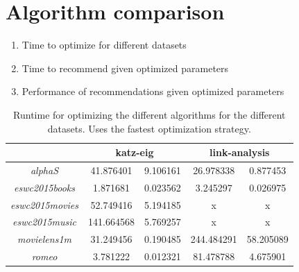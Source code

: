 
\section{Algorithm comparison}


\begin{enumerate}
    \item Time to optimize for different datasets
    \item Time to recommend given optimized parameters
    \item Performance of recommendations given optimized parameters
\end{enumerate}

\begin{table}[h!]
    \centering
    \begin{tabular}{| c | c | c | c | c |}
        \hline
        \textbf{}               & \multicolumn{2}{c|}{\textbf{katz-eig}} & \multicolumn{2}{c|}{\textbf{link-analysis}} \\ \hline
        \textit{alphaS}         & 41.876401     & 9.106161         & 26.978338     & 0.877453      \\ \hline
        \textit{eswc2015books}  & 1.871681      & 0.023562         & 3.245297      & 0.026975      \\ \hline
        \textit{eswc2015movies} & 52.749416     & 5.194185         & x             & x             \\ \hline
        \textit{eswc2015music}  & 141.664568    & 5.769257         & x             & x             \\ \hline
        \textit{movielens1m}    & 31.249456     & 0.190485         & 244.484291    & 58.205089     \\ \hline
        \textit{romeo}          & 3.781222      & 0.012321         & 81.478788     & 4.675901      \\ \hline
    \end{tabular}
    \caption{Runtime for optimizing the different algorithms for the different datasets. Uses the fastest optimization strategy.}
    \label{tab:alg_full_time}
\end{table}

